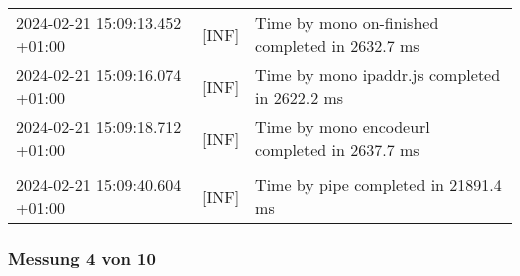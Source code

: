 {{\begin{tabularx}{\textwidth}{|l|l|X|}
                    2024-02-21 15:09:13.452 +01:00 & [INF] & Time by mono on-finished completed in 2632.7 ms \\
                    2024-02-21 15:09:16.074 +01:00 & [INF] & Time by mono ipaddr.js completed in 2622.2 ms \\
                    2024-02-21 15:09:18.712 +01:00 & [INF] & Time by mono encodeurl completed in 2637.7 ms \\
                    & & \\
                    2024-02-21 15:09:40.604 +01:00 & [INF] & Time by pipe completed in 21891.4 ms \\
                    \hline
                \end{tabularx}
            }
        }

    \subsubsection*{Messung 4 von 10} \label{subsubsec:LiteDbMehrPaketeAlsDb4von10}
